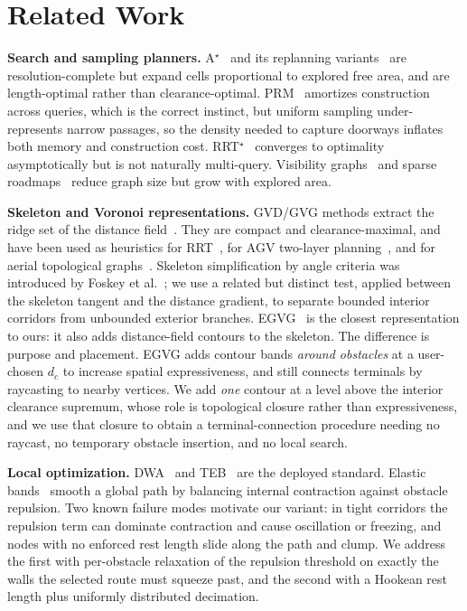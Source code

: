 \documentclass[conference]{IEEEtran}
\begin{document}
\section{Related Work}

\textbf{Search and sampling planners.} A$^\star$~\cite{hart1968} and its replanning variants~\cite{koenig2005} are resolution-complete but expand cells proportional to explored free area, and are length-optimal rather than clearance-optimal. PRM~\cite{kavraki1996} amortizes construction across queries, which is the correct instinct, but uniform sampling under-represents narrow passages, so the density needed to capture doorways inflates both memory and construction cost. RRT$^\star$~\cite{karaman2011,lavalle1998} converges to optimality asymptotically but is not naturally multi-query. Visibility graphs~\cite{yang2022far} and sparse roadmaps~\cite{dobson2014} reduce graph size but grow with explored area.

\textbf{Skeleton and Voronoi representations.} GVD/GVG methods extract the ridge set of the distance field~\cite{lau2013,hoff1999}. They are compact and clearance-maximal, and have been used as heuristics for RRT~\cite{chi2022}, for AGV two-layer planning~\cite{zhang2024agv}, and for aerial topological graphs~\cite{oleynikova2018}. Skeleton simplification by angle criteria was introduced by Foskey et al.~\cite{foskey2003}; we use a related but distinct test, applied between the skeleton tangent and the distance gradient, to separate bounded interior corridors from unbounded exterior branches. EGVG~\cite{qi2025egvg} is the closest representation to ours: it also adds distance-field contours to the skeleton. The difference is purpose and placement. EGVG adds contour bands \emph{around obstacles} at a user-chosen $d_c$ to increase spatial expressiveness, and still connects terminals by raycasting to nearby vertices. We add \emph{one} contour at a level above the interior clearance supremum, whose role is topological closure rather than expressiveness, and we use that closure to obtain a terminal-connection procedure needing no raycast, no temporary obstacle insertion, and no local search.

\textbf{Local optimization.} DWA~\cite{fox1997} and TEB~\cite{rosmann2012} are the deployed standard. Elastic bands~\cite{quinlan1993} smooth a global path by balancing internal contraction against obstacle repulsion. Two known failure modes motivate our variant: in tight corridors the repulsion term can dominate contraction and cause oscillation or freezing, and nodes with no enforced rest length slide along the path and clump. We address the first with per-obstacle relaxation of the repulsion threshold on exactly the walls the selected route must squeeze past, and the second with a Hookean rest length plus uniformly distributed decimation.
\end{document}
